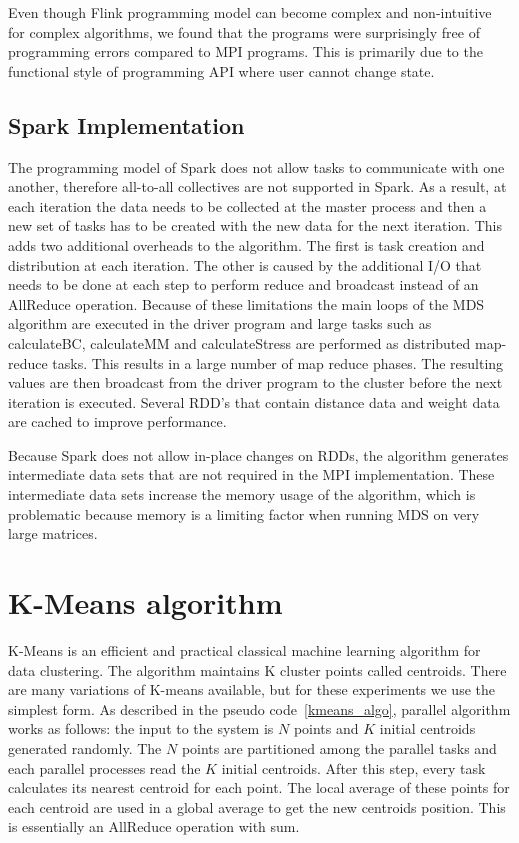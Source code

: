 \documentclass[conference]{IEEEtran}
\begin{document}
Even though Flink programming model can become complex and non-intuitive for complex algorithms, we found that the programs were surprisingly free of programming errors compared to MPI programs. This is primarily due to the functional style of programming API where user cannot change state. 
 
\subsection{Spark Implementation}

The programming model of Spark does not allow tasks to communicate with one another, therefore all-to-all collectives are not supported in Spark. As a result, at each iteration the data needs to be collected at the master process and then a new set of tasks has to be created with the new data for the next iteration. This adds two additional overheads to the algorithm. The first is task creation and distribution at each iteration. The other is caused by the additional I/O that needs to be done at each step to perform reduce and broadcast instead of an AllReduce operation. Because of these limitations the main loops of the MDS algorithm are executed in the driver program and large tasks such as calculateBC, calculateMM and calculateStress are performed as distributed map-reduce tasks. This results in a large number of map reduce phases. The resulting values are then broadcast from the driver program to the cluster before the next iteration is executed. Several RDD's that contain distance data and weight data are cached to improve performance. 

Because Spark does not allow in-place changes on RDDs, the algorithm generates intermediate data sets that are not required in the MPI implementation. These intermediate data sets increase the memory usage of the algorithm, which is problematic because memory is a limiting factor when running MDS on very large matrices.

\section{K-Means algorithm} \label{kmeans}

K-Means is an efficient and practical classical machine learning algorithm for data clustering. The algorithm maintains K cluster points called centroids. There are many variations of K-means available, but for these experiments we use the simplest form. As described in the pseudo code~\ref{kmeans_algo}, parallel algorithm works as follows: the input to the system is $N$ points and $K$ initial centroids generated randomly. The $N$ points are partitioned among the parallel tasks and each parallel processes read the $K$ initial centroids. After this step, every task calculates its nearest centroid for each point. The local average of these points for each centroid are used in a global average to get the new centroids position. This is essentially an AllReduce operation with sum. 
\end{document}
